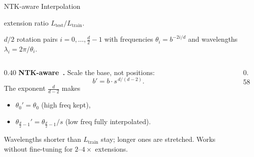 \begin{frame}{NTK-aware Interpolation}

  \begin{description}[labelwidth=\widthof{\bfseries head dim $d$:~~}, leftmargin=!, font=\small]
    \item[scale $s$:] extension ratio $L_{\text{test}}/L_{\text{train}}$.
    \item[head dim $d$:] $d/2$ rotation pairs $i = 0,\ldots,\tfrac{d}{2}{-}1$ with frequencies $\theta_i = b^{-2i/d}$ and wavelengths $\lambda_i = 2\pi/\theta_i$.
  \end{description}

  \vspace{0.4em}
  \begin{columns}[T]
    \begin{column}{0.40\textwidth}
      \textbf{NTK-aware~\cite{bloc97_2023ntk}.} Scale the base, not positions:
      \[
        b' = b \cdot s^{\,d/(d-2)}.
      \]
      The exponent $\tfrac{d}{d-2}$ makes
      \begin{itemize}
        \item $\theta_0' = \theta_0$ (high freq kept),
        \item $\theta_{\tfrac{d}{2}-1}' = \theta_{\tfrac{d}{2}-1}/s$ (low freq fully interpolated).
      \end{itemize}

      \vspace{0.3em}
      Wavelengths shorter than $L_{\text{train}}$ stay; longer ones are stretched. Works without fine-tuning for $2$--$4\times$ extensions.
    \end{column}
    \begin{column}{0.58\textwidth}
      \centering
\end{column}
\end{columns}
\end{frame}
